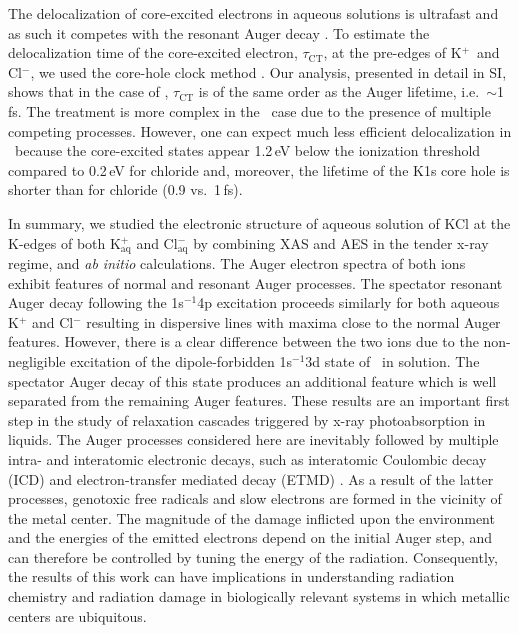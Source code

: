 The delocalization of core-excited electrons in aqueous solutions is ultrafast and as such it competes with the resonant Auger decay \citep{Nordlund07:217406,ottosson12:1}. To estimate the delocalization time of the core-excited electron, $\tau_{\text{CT}}$, at the pre-edges of K$^{+}$~and Cl$^{-}$, we used the core-hole clock method \cite{bjorneholm92:1892,karis96:1380,wurth00:141,bruehwiler02:703,foehlisch05:373}. Our analysis, presented in detail in SI, shows that in the case of \cli, $\tau_{\text{CT}}$ is of the same order as the Auger lifetime, i.e.\ $\sim$1\,fs. The treatment is more complex in the \ki~case due to the presence of multiple competing processes. However, one can expect much less efficient delocalization in \ki~because the core-excited states appear 1.2\,eV below the ionization threshold compared to 0.2\,eV for chloride and, moreover, the lifetime of the K1s core hole is shorter than for chloride (0.9 vs.\ 1\,fs).


In summary, we studied the electronic structure of aqueous solution of KCl at the K-edges of both K$^{+}_{\text{aq}}$ and Cl$^{-}_{\text{aq}}$ by combining XAS and AES in the tender x-ray regime, and {\it ab initio} calculations. The Auger electron spectra of both ions exhibit features of normal and resonant Auger processes. The spectator resonant Auger decay following the 1s$^{-1}$4p excitation proceeds similarly for both aqueous K$^{+}$ and Cl$^{-}$ resulting in dispersive lines with maxima close to the normal Auger features. However, there is a clear difference between the two ions due to the non-negligible excitation of the dipole-forbidden 1s$^{-1}$3d state of \ki~in solution. The spectator Auger decay of this state produces an additional feature which is well separated from the remaining Auger features. These results are an important first step in the study of relaxation cascades triggered by x-ray photoabsorption in liquids. The Auger processes considered here are inevitably followed by multiple intra- and interatomic electronic decays, such as interatomic Coulombic decay (ICD) and electron-transfer mediated decay (ETMD) \citep{unger17:708,Stumpf16:237}. As a result of the latter processes, genotoxic free radicals and slow electrons are formed in the vicinity of the metal center. The magnitude of the damage inflicted upon the environment and the energies of the emitted electrons depend on the initial Auger step, and can therefore be controlled by tuning the energy of the radiation. Consequently, the results of this work can have implications in understanding radiation chemistry and radiation damage in biologically relevant systems in which metallic centers are ubiquitous.
